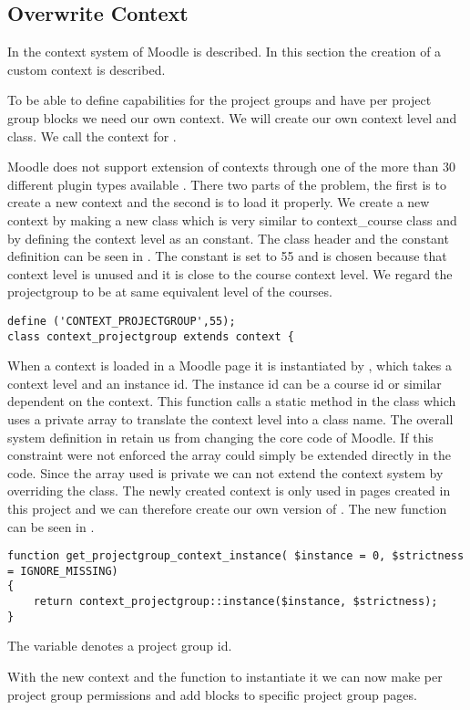 
\subsection{Overwrite Context}
In   the context system of Moodle is described. In this section the creation of a custom context is described. 

To be able to define capabilities for the project groups and have per project group blocks we need our own context. We will create our own context level and class.
We call the context for . 

Moodle does not support extension of contexts through one of the more than 30 different plugin types available \cite{moodleplugins}. 
There two parts of the problem, the first is to create a new context and the second is to load it properly. 
We create a new context by making a new class which is very similar to context\_course class and by defining the context level as an constant. 
The class header and the constant definition can be seen in . 
The constant is set to 55 and is chosen because that context level is unused and it is close to the course context level. 
We regard the projectgroup to be at same equivalent level of the courses. 

\begin{lstlisting}[style=phpCode, caption=\myCaption{The context\_projectgroup class header and constant definition}, label=codeprojectgroupcontext]
define ('CONTEXT_PROJECTGROUP',55);
class context_projectgroup extends context {
\end{lstlisting}

When a context is loaded in a Moodle page it is instantiated by , which takes a context level and an instance id. 
The instance id can be a course id or similar dependent on the context. 
This function calls a static method in the  class which uses a private array to translate the context level into a class name.
The overall system definition in  retain us from changing the core code of Moodle. 
If this constraint were not enforced the array could simply be extended directly in the code.  
Since the array used is private we can not extend the context system by overriding the  class. 
The newly created context is only used in pages created in this project and we can therefore create our own version of . 
The new function can be seen in .
\begin{lstlisting}[style=phpCode, caption=\myCaption{The function to get projectgroup context}, label=codeprojectgroupcontextinstance]
function get_projectgroup_context_instance( $instance = 0, $strictness = IGNORE_MISSING) 
{ 
    return context_projectgroup::instance($instance, $strictness);
}
\end{lstlisting}
The  variable denotes a project group id. 

With the new context and the function to instantiate it we can now make per project group permissions and add blocks to specific project group pages. 